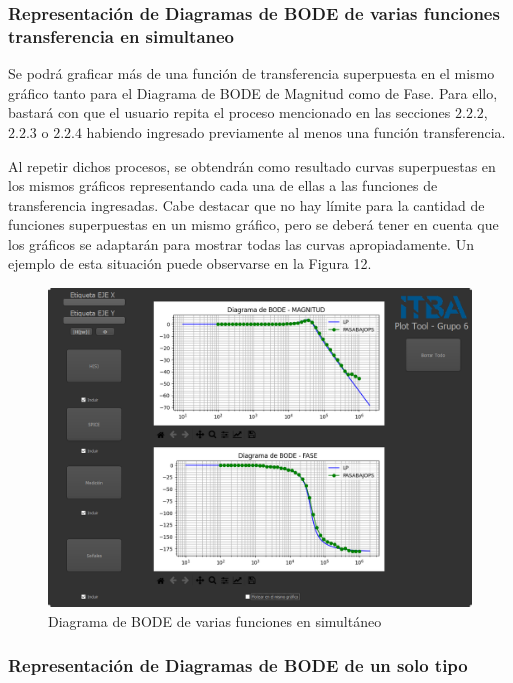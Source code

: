 \vspace{3cm}

\subsubsection{Representación de Diagramas de BODE de varias funciones transferencia en simultaneo}

Se podrá graficar más de una función de transferencia superpuesta en el mismo gráfico tanto para el Diagrama de BODE de Magnitud como de Fase.
Para ello, bastará con que el usuario repita el proceso mencionado en las secciones $2.2.2$, $2.2.3$ o $2.2.4$ habiendo ingresado previamente al menos una función transferencia.

Al repetir dichos procesos, se obtendrán como resultado curvas superpuestas en los mismos gráficos representando cada una de ellas a las funciones de transferencia ingresadas. 
Cabe destacar que no hay límite para la cantidad de funciones superpuestas en un mismo gráfico, pero se deberá tener en cuenta que los gráficos se adaptarán para mostrar todas las curvas apropiadamente.
Un ejemplo de esta situación puede observarse en la Figura 12.

\begin{figure}[!htb] 
    \centering 
    \includegraphics [width=0.8
    \textwidth] {../EJ2/LatexScreenshots/plotToolMulti.png} 
    \caption{Diagrama de BODE de varias funciones en simultáneo}
    \label{fig:multiPlotTool}
\end{figure}

\subsubsection{Representación de Diagramas de BODE de un solo tipo}

